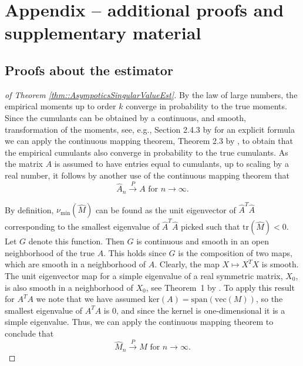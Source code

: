 \documentclass{biometrika}
\begin{document}
\appendixtwo

\section{Appendix -- additional proofs and supplementary material}

\subsection{Proofs about the estimator} \label{sec::Proofsabouttheest}



\begin{proof}[ of Theorem \ref{thm::AsympoticsSingularValueEst}]
By the law of large numbers, the empirical moments up to order $k$ converge in probability to the true moments.
Since the cumulants can be obtained by a continuous, and smooth, transformation of the moments, see, e.g., Section 2.4.3 by \cite{mccullagh2018tensor} for an explicit formula we can apply the continuous mapping theorem, Theorem 2.3 by \cite{Vaart_1998}, to obtain that the empirical cumulants also converge in probability to the true cumulants. As the matrix $A$ is assumed to have entries equal to cumulants, up to scaling by a real number, it follows by another use of the continuous mapping theorem that
$$\hat{A}_n \xrightarrow{P} A \text{ for } n \rightarrow \infty.$$

By definition, $\nu_{\mathrm{min}}(\hat{M})$ can be found as the unit eigenvector of $\hat{A}^T \hat{A}$ corresponding to the smallest eigenvalue of $\hat{A}^T \hat{A}$ picked such that $\mathrm{tr}(\hat{M}) < 0$. Let $G$ denote this function. Then $G$ is continuous and smooth in an open neighborhood of the true $A$. This holds since $G$ is the composition of two maps, which are smooth in a neighborhood of $A$. 
Clearly, the map $X \mapsto X^T X$ is smooth. 
The unit eigenvector map for a simple eigenvalue of a real symmetric matrix, $X_0$, is also smooth
in a neighborhood of $X_0$, see Theorem~1 by \cite{Magnus_1985}. To apply this result for $A^TA$ we note that we have assumed $\mathrm{ker}(A) = \mathrm{span}(\mathrm{vec}(M))$, so the 
smallest eigenvalue of $A^TA$ is $0$, and since the kernel is one-dimensional it is a simple eigenvalue. 
Thus, 
we can apply the continuous mapping theorem to conclude that $$\hat{M}_n \xrightarrow{P} M \text{ for } n \rightarrow \infty.$$


\end{proof}
\end{document}
